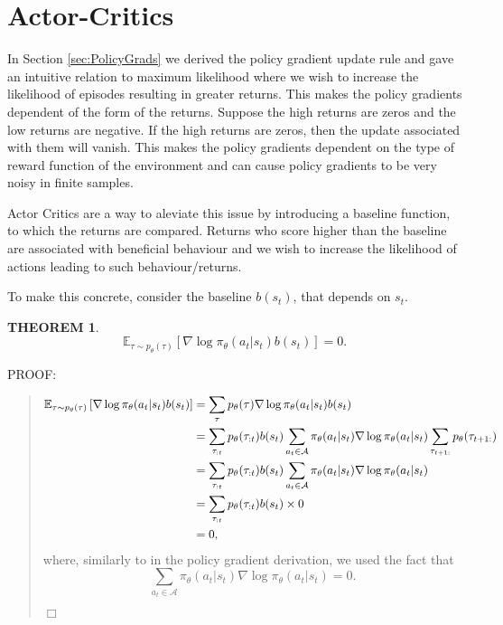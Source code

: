\documentclass{report}
\newtheorem{theorem}{THEOREM}
\newenvironment{proof}{
PROOF:
\begin{quotation}}{
$\Box$ \end{quotation}}
\numberwithin{equation}{section}
\numberwithin{figure}{section}
\numberwithin{table}{section}
\numberwithin{algorithm}{section}
\begin{document}
\section{Actor-Critics}
In Section \ref{sec:PolicyGrads} we derived the policy gradient 
update rule and gave an intuitive relation to maximum likelihood 
where we wish to increase the likelihood of episodes resulting 
in greater returns. This makes the policy gradients dependent of 
the form of the returns. Suppose the high returns are zeros and 
the low returns are negative. If the high returns are zeros, then 
the update associated with them will vanish. This makes the policy 
gradients dependent on the type of reward function of the environment 
and can cause policy gradients to be very noisy in finite samples.

Actor Critics \citep{Tsitsiklis} are a way to aleviate this issue 
by introducing a baseline function, to which the returns are compared.
Returns who score higher than the baseline are associated with 
beneficial behaviour and we wish to increase the likelihood 
of actions leading to such behaviour/returns.

To make this concrete, consider the baseline $b(s_t)$, that depends 
on $s_t$.

\begin{theorem}\label{thm:baselineThm}
  \begin{equation*}
    \mathbb{E}_{\tau\sim p_\theta(\tau)}\left[\nabla \log \pi_\theta(a_t|s_t)
    b(s_t)\right]=0.  
  \end{equation*}
\end{theorem}

\begin{proof}
  \begin{align}
    \mathbb{E}_{\tau\sim p_\theta(\tau)}\left[\nabla \log \pi_\theta(a_t|s_t)
    b(s_t)\right]&= \sum_{\tau}p_\theta(\tau)\nabla \log\pi_\theta(a_t|s_t)b(s_t)\notag\\
    &=\sum_{\tau_{:t}}p_\theta(\tau_{:t})b(s_t)\sum_{a_t\in\mathcal{A}}\pi_\theta(a_t|s_t)\nabla \log\pi_\theta(a_t|s_t) \sum_{\tau_{t+1:}}p_\theta(\tau_{t+1:})\notag\\
    &=\sum_{\tau_{:t}}p_\theta(\tau_{:t})b(s_t)\sum_{a_t\in\mathcal{A}}\pi_\theta(a_t|s_t)\nabla \log\pi_\theta(a_t|s_t)\notag\\
    &=\sum_{\tau_{:t}}p_\theta(\tau_{:t})b(s_t)\times 0\notag\\
    &=0,
  \end{align}
  where, similarly to in the policy gradient derivation, we used the fact that 
  \begin{equation*}
    \sum_{a_t\in\mathcal{A}}\pi_\theta(a_t|s_t)\nabla \log\pi_\theta(a_t|s_t)=0. 
  \end{equation*}
\end{proof}
\end{document}
